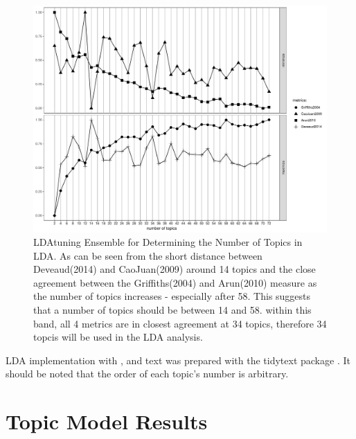 \begin{figure}
	\centering
	\includegraphics[width=1\linewidth]{Figures/ChapterV/TopicSelection}
	\caption[LDAtuning Ensemble for Determining the Number of Topics in LDA]{LDAtuning Ensemble for Determining the Number of Topics in LDA.   As can be seen from the short distance between Deveaud(2014) and CaoJuan(2009) around 14 topics and the close agreement between the Griffiths(2004) and Arun(2010) measure as the number of topics increases - especially after 58.  This suggests that a number of topics should be between 14 and 58.  within  this band, all 4 metrics are in closest agreement at 34 topics, therefore 34 topcis will be used in the LDA analysis.    }
	\label{fig:topicselection}
\end{figure}
	

	
LDA implementation with \cite{topicmodels}, and text was prepared with the tidytext package \cite{tidytext}.  It should be noted that the order of each topic's number is arbitrary. 
	
\section{Topic Model Results}
	
